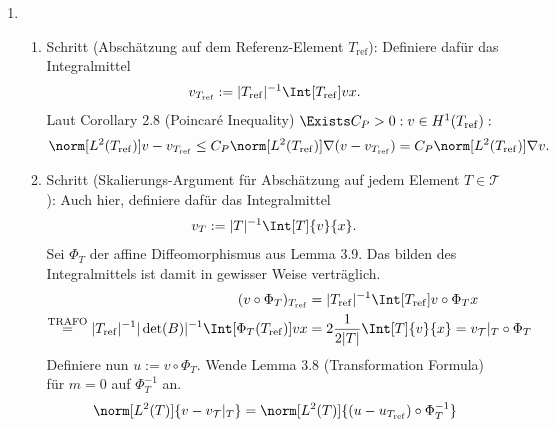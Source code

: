 \begin{solution}
\phantom{}
\begin{enumerate}[label = \textbf{\alph*)}]
  \item
  \begin{enumerate}[label = \arabic*.]
    \item Schritt (Abschätzung auf dem Referenz-Element $T_\mathrm{ref}$):
    Definiere dafür das Integralmittel
    \begin{align*}
      v_{T_\mathrm{ref}}
      :=
      |T_\mathrm{ref}|^{-1}
      \Int[T_\mathrm{ref}]{v}{x}.
    \end{align*}
    Laut Corollary 2.8 (Poincaré Inequality) $\Exists C_P > 0: v \in H^1(T_\mathrm{ref}):$
    \begin{align*}
      \norm[L^2(T_\mathrm{ref})]{v - v_{T_\mathrm{ref}}}
      \leq
      C_P \norm[L^2(T_\mathrm{ref})]{\nabla (v- v_{T_\mathrm{ref}})}
      =
      C_P \norm[L^2(T_\mathrm{ref})]{\nabla v}.
    \end{align*}
    \item Schritt (Skalierungs-Argument für Abschätzung auf jedem Element $T \in \mathcal{T}$):
    Auch hier, definiere dafür das Integralmittel
    \begin{align*}
      v_T
      :=
      |T|^{-1}
      \Int[T]{v}{x}.
    \end{align*}
    Sei $\Phi_T$ der affine Diffeomorphismus aus Lemma 3.9.
    Das bilden des Integralmittels ist damit in gewisser Weise verträglich.
    \begin{align*}
      (v \circ \Phi_T)_{T_\mathrm{ref}}
      &=
      |T_\mathrm{ref}|^{-1}
      \Int[T_\mathrm{ref}]{v \circ \Phi_T}{x} \\
      \stackrel
      {
        \mathrm{TRAFO}
      }{=}
      |T_\mathrm{ref}|^{-1}
      |\det(B)|^{-1}
      \Int[\Phi_T(T_\mathrm{ref})]{v}{x}
      &=
      2 \frac{1}{2 |T|}
      \Int[T]{v}{x}
      =
      v_\mathcal{T}|_T \circ \Phi_T
    \end{align*}
    Definiere nun $u := v \circ \Phi_T$.
    Wende Lemma 3.8 (Transformation Formula) für $m = 0$ auf $\Phi_T^{-1}$ an.
    \begin{multline*}
      \norm[L^2(T)]{v - v_\mathcal{T}|_T}
      =
      \norm[L^2(T)]{(u - u_{T_\mathrm{ref}}) \circ \Phi_T^{-1}} \\

\end{multline*}
\end{enumerate}
\end{enumerate}
\end{solution}
